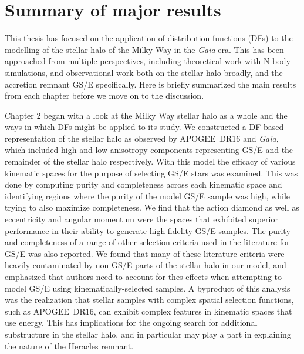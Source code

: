 \section{Summary of major results}

This thesis has focused on the application of distribution functions (DFs) to the modelling of the stellar halo of the Milky Way in the \textit{Gaia} era. This has been approached from multiple perspectives, including theoretical work with N-body simulations, and observational work both on the stellar halo broadly, and the accretion remnant GS/E specifically. Here is briefly summarized the main results from each chapter before we move on to the discussion.

Chapter 2 began with a look at the Milky Way stellar halo as a whole and the ways in which DFs might be applied to its study. We constructed a DF-based representation of the stellar halo as observed by APOGEE~DR16 and \textit{Gaia}, which included high and low anisotropy components representing GS/E and the remainder of the stellar halo respectively. With this model the efficacy of various kinematic spaces for the purpose of selecting GS/E stars was examined. This was done by computing purity and completeness across each kinematic space and identifying regions where the purity of the model GS/E sample was high, while trying to also maximize completeness. We find that the action diamond as well as eccentricity and angular momentum were the spaces that exhibited superior performance in their ability to generate high-fidelity GS/E samples. The purity and completeness of a range of other selection criteria used in the literature for GS/E was also reported. We found that many of these literature criteria were heavily contaminated by non-GS/E parts of the stellar halo in our model, and emphasized that authors need to account for thes effects when attempting to model GS/E using kinematically-selected samples. A byproduct of this analysis was the realization that stellar samples with complex spatial selection functions, such as APOGEE~DR16, can exhibit complex features in kinematic spaces that use energy. This has implications for the ongoing search for additional substructure in the stellar halo, and in particular may play a part in explaining the nature of the Heracles remnant. 

